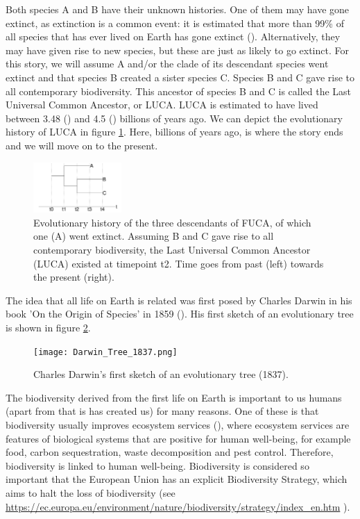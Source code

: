 Both species A and B have their unknown histories.
One of them may have gone extinct, as extinction 
is a common event: it is estimated that more than 99\% 
of all species that has ever lived on Earth has gone 
extinct (\cite{newman1997model}).
Alternatively, they may have given rise to new species, but these
are just as likely to go extinct.
For this story, we will assume A and/or the clade of its descendant species went
extinct and that species B created a sister species C. 
Species B and C gave rise to all contemporary biodiversity. 
This ancestor of species B and C 
is called the Last Universal Common Ancestor, or LUCA.
LUCA is estimated to have lived between 3.48 (\cite{noffke2013microbially}) 
and 4.5 (\cite{betts2018integrated}) billions of years ago.
We can depict the evolutionary
history of LUCA in figure \ref{fig:t_3}.
Here, billions of years ago, is where the story ends 
and we will move on to the present.

\begin{figure}[H]
  \includegraphics[width=0.3\textwidth]{t_3.png}
  \caption{
    Evolutionary history of the three descendants of FUCA,
    of which one (A) went extinct.
    Assuming B and C gave rise to all contemporary biodiversity,
    the Last Universal Common Ancestor (LUCA) existed at timepoint t2. Time goes from past (left) towards the present (right).
  }
  \label{fig:t_3}
\end{figure}

The idea that all life on Earth is related was first posed by Charles Darwin in his book 'On the Origin of Species' 
in 1859 (\cite{darwin}).
His first sketch of an evolutionary tree is shown in figure 
\ref{fig:darwins_phylogeny}.

\begin{figure}[H]
  \texttt{[image: Darwin\_Tree\_1837.png]}
  \caption{
    Charles Darwin's first sketch of an evolutionary tree (1837).
  }
  \label{fig:darwins_phylogeny}
\end{figure}

The biodiversity derived from the first life on Earth 
is important to us humans (apart from that is has created us) for many reasons. One of these is that biodiversity usually improves ecosystem 
services (\cite{cardinale2012biodiversity}),
where ecosystem services are features of biological systems that are 
positive for human well-being, for example food,
carbon sequestration, waste decomposition and pest control. Therefore, biodiversity is linked to human well-being. Biodiversity is considered so important that the European Union has an explicit Biodiversity Strategy,
which aims to halt the loss of biodiversity (see 
  \url{https://ec.europa.eu/environment/nature/biodiversity/strategy/index_en.htm}
).

